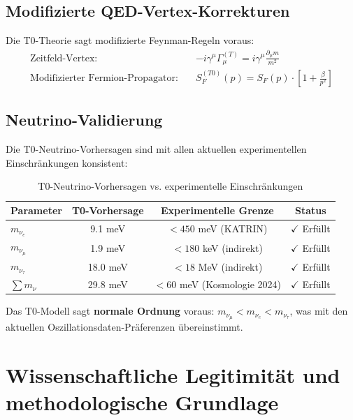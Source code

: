 \subsection{Modifizierte QED-Vertex-Korrekturen}
\label{subsec:qed_corrections}

Die T0-Theorie sagt modifizierte Feynman-Regeln voraus:
\begin{align}
	\text{Zeitfeld-Vertex:} \quad &-i\gamma^\mu\Gamma_\mu^{(T)} = i\gamma^\mu\frac{\partial_\mu m}{m^2} \\
	\text{Modifizierter Fermion-Propagator:} \quad &S_F^{(T0)}(p) = S_F(p) \cdot \left[1 + \frac{\beta}{p^2}\right]
\end{align}

\subsection{Neutrino-Validierung}
\label{subsec:neutrino_validation}

Die T0-Neutrino-Vorhersagen sind mit allen aktuellen experimentellen Einschränkungen konsistent:

\begin{table}[H]
	\centering
	\begin{tabular}{lccc}
		\toprule
		\textbf{Parameter} & \textbf{T0-Vorhersage} & \textbf{Experimentelle Grenze} & \textbf{Status} \\
		\midrule
		$m_{\nu_e}$ & 9.1 meV & $< 450$ meV (KATRIN) & $\checkmark$ Erfüllt \\
		$m_{\nu_\mu}$ & 1.9 meV & $< 180$ keV (indirekt) & $\checkmark$ Erfüllt \\
		$m_{\nu_\tau}$ & 18.0 meV & $< 18$ MeV (indirekt) & $\checkmark$ Erfüllt \\
		$\sum m_\nu$ & 29.8 meV & $< 60$ meV (Kosmologie 2024) & $\checkmark$ Erfüllt \\
		\bottomrule
	\end{tabular}
	\caption{T0-Neutrino-Vorhersagen vs. experimentelle Einschränkungen}
	\label{tab:neutrino_validation}
\end{table}

\begin{important}
	Das T0-Modell sagt \textbf{normale Ordnung} voraus: $m_{\nu_\mu} < m_{\nu_e} < m_{\nu_\tau}$, was mit den aktuellen Oszillationsdaten-Präferenzen übereinstimmt.
\end{important}

\section{Wissenschaftliche Legitimität und methodologische Grundlage}
\label{sec:scientific_legitimacy}


